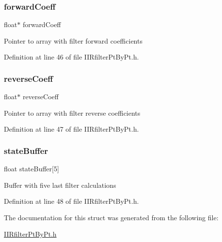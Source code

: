 \subsubsection{\texorpdfstring{forwardCoeff}{forwardCoeff}}
{\footnotesize\ttfamily float$\ast$ forward\+Coeff}

Pointer to array with filter forward coefficients 

Definition at line 46 of file I\+I\+Rfilter\+Pt\+By\+Pt.\+h.

\mbox{\label{struct_i_i_r4th_order_filter_obj_a71cf702e70d0407aedf468a1d5f09242_a71cf702e70d0407aedf468a1d5f09242}} 
\subsubsection{\texorpdfstring{reverseCoeff}{reverseCoeff}}
{\footnotesize\ttfamily float$\ast$ reverse\+Coeff}

Pointer to array with filter reverse coefficients 

Definition at line 47 of file I\+I\+Rfilter\+Pt\+By\+Pt.\+h.

\mbox{\label{struct_i_i_r4th_order_filter_obj_a498b39863252152549078f926f0b51f8_a498b39863252152549078f926f0b51f8}} 
\subsubsection{\texorpdfstring{stateBuffer}{stateBuffer}}
{\footnotesize\ttfamily float state\+Buffer\mbox{[}5\mbox{]}}

Buffer with five last filter calculations 

Definition at line 48 of file I\+I\+Rfilter\+Pt\+By\+Pt.\+h.



The documentation for this struct was generated from the following file\+:\begin{DoxyCompactItemize}
\item 
\mbox{\hyperlink{_i_i_rfilter_pt_by_pt_8h}{I\+I\+Rfilter\+Pt\+By\+Pt.\+h}}\end{DoxyCompactItemize}

